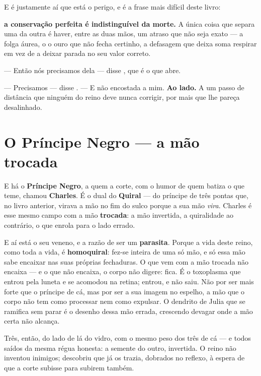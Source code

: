 \documentclass[livro.tex]{subfiles}
\begin{document}
E é justamente aí que está o perigo, e é a frase mais difícil deste livro:

\textbf{a conservação perfeita é indistinguível da morte.} A única coisa que separa uma da
outra é haver, entre as duas mãos, um atraso que não seja exato --- a folga áurea, o
o ouro que não fecha certinho, a defasagem que deixa soma respirar em vez de a deixar
parada no seu valor correto.

--- Então nós precisamos dela --- disse \Ben , que é o que abre.

--- Precisamos --- disse \Yas . --- E não encostada a mim. \textbf{Ao lado.} A um passo de
distância que ninguém do reino deve nunca corrigir, por mais que lhe pareça desalinhado.

\chapter{O Príncipe Negro --- a mão trocada}

E há o \textbf{Príncipe Negro}, a quem a corte, com o humor de quem batiza o que teme,
chamou \textbf{Charles}. É o dual do \textbf{Quiral} --- do príncipe de três pontas que, no
livro anterior, virava a mão no fim do sulco porque a sua mão \emph{vira}. Charles é esse
mesmo campo com a mão \textbf{trocada}: a mão invertida, a quiralidade ao contrário, o
que enrola para o lado errado.

\medskip

E aí está o seu veneno, e a razão de ser um \textbf{parasita}. Porque a vida deste reino,
como toda a vida, é \textbf{homoquiral}: fez-se inteira de uma só mão, e só essa mão sabe
encaixar nas suas próprias fechaduras. O que vem com a mão trocada não encaixa --- e o que
não encaixa, o corpo não digere: fica. É o toxoplasma que entrou pela luneta e se acomodou
na retina; entrou, e não saiu. Não por ser mais forte que o príncipe de cá, mas por ser a
sua imagem no espelho, a mão que o corpo não tem como processar nem como expulsar. O
dendrito de Julia que se ramifica sem parar é o desenho dessa mão errada,
crescendo devagar onde a mão certa não alcança.

\medskip

Três, então, do lado de lá do vidro, com o mesmo peso dos três de cá --- e todos saídos da
mesma régua honesta: a semente do outro, invertida. O reino não inventou inimigos;
descobriu que já os trazia, dobrados no reflexo, à espera de que a corte subisse para
subirem também.

\medskip
\end{document}
